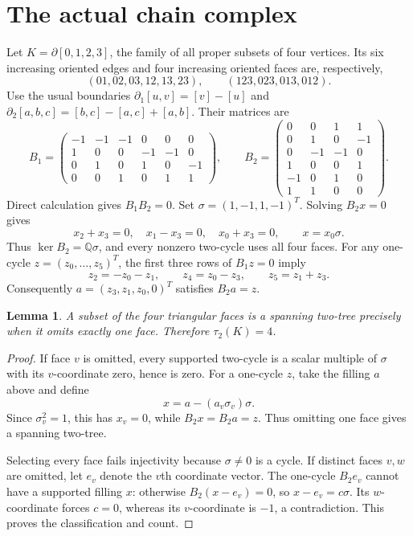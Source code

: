 \documentclass[11pt]{article}
\newtheorem{lemma}{Lemma}
\newcommand{\Q}{\mathbb Q}
\begin{document}
\section*{The actual chain complex}
Let $K=\partial[0,1,2,3]$, the family of all proper subsets of four
vertices. Its six increasing oriented edges and four increasing oriented
faces are, respectively,
\[
 (01,02,03,12,13,23),\qquad (123,023,013,012).
\]
Use the usual boundaries $\partial_1[u,v]=[v]-[u]$ and
$\partial_2[a,b,c]=[b,c]-[a,c]+[a,b]$. Their matrices are
\[
 B_1=\begin{pmatrix}
 -1&-1&-1&0&0&0\\
 1&0&0&-1&-1&0\\
 0&1&0&1&0&-1\\
 0&0&1&0&1&1
 \end{pmatrix},\qquad
 B_2=\begin{pmatrix}
 0&0&1&1\\0&1&0&-1\\0&-1&-1&0\\
 1&0&0&1\\-1&0&1&0\\1&1&0&0
 \end{pmatrix}.
\]
Direct calculation gives $B_1B_2=0$. Set
$\sigma=(1,-1,1,-1)^T$. Solving $B_2x=0$ gives
\[
 x_2+x_3=0,\quad x_1-x_3=0,\quad x_0+x_3=0,
 \qquad x=x_0\sigma.
\]
Thus $\ker B_2=\Q\sigma$, and every nonzero two-cycle uses all four faces.
For any one-cycle $z=(z_0,\ldots,z_5)^T$, the first three rows of
$B_1z=0$ imply
\[
 z_2=-z_0-z_1,\qquad z_4=z_0-z_3,\qquad z_5=z_1+z_3.
\]
Consequently $a=(z_3,z_1,z_0,0)^T$ satisfies $B_2a=z$.

\begin{lemma}
A subset of the four triangular faces is a spanning two-tree precisely
when it omits exactly one face. Therefore $\tau_2(K)=4$.
\end{lemma}
\begin{proof}
If face $v$ is omitted, every supported two-cycle is a scalar multiple
of $\sigma$ with its $v$-coordinate zero, hence is zero.
For a one-cycle $z$, take the filling $a$ above and define
\[
 x=a-(a_v\sigma_v)\sigma.
\]
Since $\sigma_v^2=1$, this has $x_v=0$, while
$B_2x=B_2a=z$. Thus omitting one face gives a spanning two-tree.

Selecting every face fails injectivity because $\sigma\ne0$ is a cycle.
If distinct faces $v,w$ are omitted, let $e_v$ denote the $v$th coordinate
vector. The one-cycle $B_2e_v$ cannot have a supported filling $x$:
otherwise $B_2(x-e_v)=0$, so $x-e_v=c\sigma$.
Its $w$-coordinate forces $c=0$, whereas its $v$-coordinate is $-1$,
a contradiction. This proves the classification and count.
\end{proof}
\end{document}
